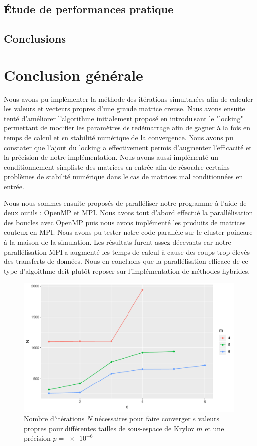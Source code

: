\documentclass[11pt,a4paper]{article}
\begin{document}
	\subsection{Étude de performances pratique}
	\subsection{Conclusions}

\section{Conclusion générale}

	Nous avons pu implémenter la méthode des itérations simultanées afin de calculer les valeurs et vecteurs propres d'une grande matrice creuse. Nous avons ensuite tenté d'améliorer l'algorithme initialement proposé en introduisant le "locking" permettant de modifier les paramètres de redémarrage afin de gagner à la fois en temps de calcul et en stabilité numérique de la convergence. Nous avons pu constater que l'ajout du locking a effectivement permis d'augmenter l'efficacité et la précision de notre implémentation. Nous avons aussi implémenté un conditionnement simpliste des matrices en entrée afin de résoudre certains problèmes de stabilité numérique dans le cas de matrices mal conditionnées en entrée.

	Nous nous sommes ensuite proposés de paralléliser notre programme à l'aide de deux outils : OpenMP et MPI. Nous avons tout d'abord effectué la parallélisation des boucles avec OpenMP puis nous avons implémenté les produits de matrices couteux en MPI. Nous avons pu tester notre code parallèle sur le cluster poincare à la maison de la simulation. Les résultats furent assez décevants car notre parallélisation MPI a augmenté les temps de calcul à cause des coups trop élevés des transferts de données. Nous en concluons que la parallélisation efficace de ce type d'algoithme doit plutôt reposer sur l'implémentation de méthodes hybrides.


\begin{figure}
	\centering
	\includegraphics[width=0.8\linewidth, keepaspectratio]{plots/Nvse-m_p6.pdf}
	\caption{Nombre d'itérations $N$ nécessaires pour faire converger $e$ valeurs propres pour différentes tailles de sous-espace de Krylov $m$ et une précision $p=\SI{e-6}{}$ \label{fig:Nvse-m_p6}}
\end{figure}
\end{document}
